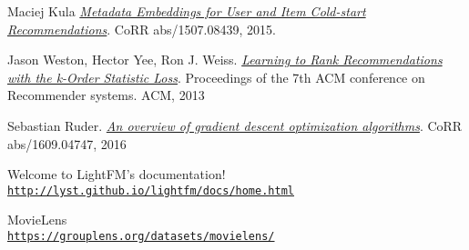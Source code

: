 \begin{thebibliography}{9}
	\hypertarget{maciejlightfm}{} 
	Maciej Kula
	\textit{\href{https://arxiv.org/pdf/1507.08439.pdf}{Metadata Embeddings for User and Item Cold-start Recommendations}}.
	CoRR abs/1507.08439, 2015.
	
	\hypertarget{jasonkos}{} 
	Jason Weston, Hector Yee, Ron J. Weiss.
	\textit{\href{https://static.googleusercontent.com/media/research.google.com/ro//pubs/archive/41534.pdf}{Learning to Rank Recommendations
with the k-Order Statistic Loss}}.
	Proceedings of the 7th ACM conference on Recommender systems. ACM, 2013
	
	\hypertarget{ruder2016}{} 
	Sebastian Ruder.
	\textit{\href{http://arxiv.org/abs/1609.04747}{An overview of gradient descent optimization algorithms}}.
	CoRR abs/1609.04747, 2016
	
	\hypertarget{lightfm}{} 
	Welcome to LightFM’s documentation!
	\\\texttt{\url{http://lyst.github.io/lightfm/docs/home.html}}
	
	\hypertarget{movielens}{} 
	MovieLens
	\\\texttt{\url{https://grouplens.org/datasets/movielens/}}
\end{thebibliography}
